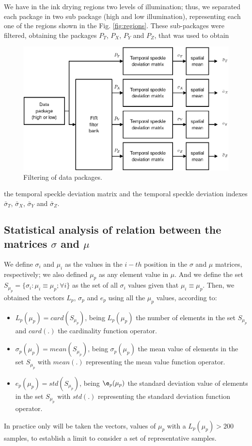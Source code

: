 \documentclass[review]{elsarticle}
\begin{document}
We have in the ink drying regions
two levels of illumination; thus, we  separated each package in two sub package
(high and low illumination), representing each one of the regions shown in the Fig. \ref{fig:regions}.
These sub-packages were filtered,
obtaining the packages $P_T$, $P_X$, $P_Y$ and $P_Z$, that was used to obtain
\begin{figure}[h!]
\centering
\includegraphics[width=0.65\columnwidth]{filtering.eps}
\caption{Filtering of data packages.}
\label{fig:filtering}
\end{figure}
the temporal speckle deviation matrix and the 
temporal speckle deviation indexes $\bar{\sigma}_T$, $\bar{\sigma}_X$, $\bar{\sigma}_Y$ and
$\bar{\sigma}_Z$.

\subsection{Statistical analysis of relation between the matrices $\sigma$ and $\mu$}
\label{subsec:statistical}
We define $\sigma_i$ and $\mu_i$
as the values in the $i-th$ position in the $\sigma$  
and $\mu$ matrices, respectively; we also defined $\mu_p$
as any element value in  $\mu$.
And we define the set $S_{\mu_p}=\{\sigma_i: \mu_i\equiv \mu_p; \forall i\}$
as the set of all $\sigma_i$  values given that $\mu_i\equiv\mu_p$.
Then, we obtained the vectors $L_p$, $\sigma_p$ and
$e_p$ using all the $\mu_p$ values, according to:
\begin{itemize}
 \item $L_p(\mu_p)=card\left(S_{\mu_p}\right)$,  being $L_p(\mu_p)$ the number of elements
 in the set $S_{\mu_p}$ and $card(.)$ the cardinality function operator.
 \item $\sigma_p(\mu_p)=mean\left(S_{\mu_p}\right)$, being $\sigma_p(\mu_p)$
 the mean value of elements in the set $S_{\mu_p}$ with $mean(.)$ representing the mean value function operator.
 \item $e_p(\mu_p)=std\left(S_{\mu_p}\right)$, being $\e_p(\mu_p)$
 the standard  deviation value of elements in the set $S_{\mu_p}$ with $std(.)$ representing the standard deviation function operator.
\end{itemize}
In practice only will be taken the vectors, values of $\mu_p$
with a $L_p(\mu_p)>200$ samples, to establish a limit to consider a set of representative samples.
\end{document}
